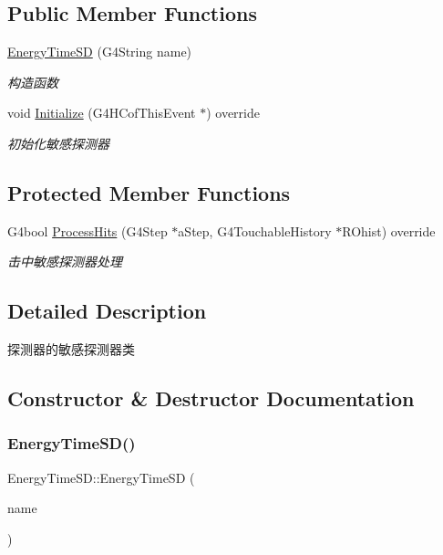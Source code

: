 \subsection*{Public Member Functions}
\begin{DoxyCompactItemize}
\item 
\hyperlink{classEnergyTimeSD_a501274766adbbe35de4e8f307ed5b411}{Energy\+Time\+SD} (G4\+String name)
\begin{DoxyCompactList}\small\item\em 构造函数 \end{DoxyCompactList}\item 
void \hyperlink{classEnergyTimeSD_a81809ac7ecdc9eb7bcdc00d489cb9fb3}{Initialize} (G4\+H\+Cof\+This\+Event $\ast$) override
\begin{DoxyCompactList}\small\item\em 初始化敏感探测器 \end{DoxyCompactList}\end{DoxyCompactItemize}
\subsection*{Protected Member Functions}
\begin{DoxyCompactItemize}
\item 
G4bool \hyperlink{classEnergyTimeSD_a24131df6ca564ef0a71e49c4625d5477}{Process\+Hits} (G4\+Step $\ast$a\+Step, G4\+Touchable\+History $\ast$R\+Ohist) override
\begin{DoxyCompactList}\small\item\em 击中敏感探测器处理 \end{DoxyCompactList}\end{DoxyCompactItemize}


\subsection{Detailed Description}
探测器的敏感探测器类 

\subsection{Constructor \& Destructor Documentation}
\mbox{\label{classEnergyTimeSD_a501274766adbbe35de4e8f307ed5b411}} 
\subsubsection{\texorpdfstring{Energy\+Time\+S\+D()}{EnergyTimeSD()}}
{\footnotesize\ttfamily Energy\+Time\+S\+D\+::\+Energy\+Time\+SD (\begin{DoxyParamCaption}\item[{G4\+String}]{name }\end{DoxyParamCaption})}



